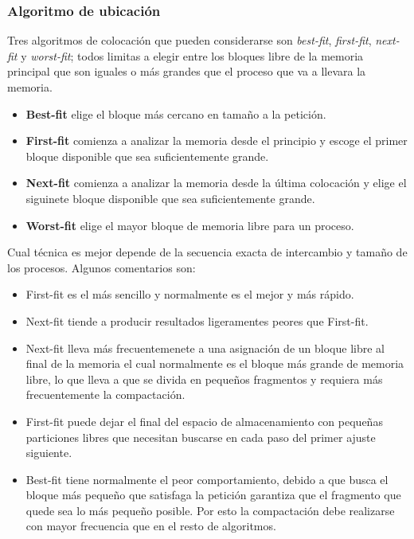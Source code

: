 \documentclass[12pt, a4paper]{article}
\begin{document}
\subsubsection{Algoritmo de ubicación}
Tres algoritmos de colocación que pueden considerarse son \textit{best-fit}, \textit{first-fit}, \textit{next-fit} y \textit{worst-fit}; todos limitas a elegir entre los bloques libre de la memoria principal que son iguales o más grandes que el proceso que va a llevara  la memoria. 
\begin{itemize}
    \item \textbf{Best-fit} elige el bloque más cercano en tamaño a la petición.
    \item \textbf{First-fit} comienza a analizar la memoria desde el principio y escoge el primer bloque disponible que sea suficientemente grande.
    \item \textbf{Next-fit} comienza a analizar la memoria desde la última colocación y elige el siguinete bloque disponible que sea suficientemente grande.
    \item \textbf{Worst-fit} elige el mayor bloque de memoria libre para un proceso.
\end{itemize}
\begin{tcolorbox}[colback=cyan!10, colframe=blue!70, title=Nota]
    Cual técnica es mejor depende de la secuencia exacta de intercambio y tamaño de los procesos. Algunos comentarios son:
    \begin{itemize}
        \item First-fit es el más sencillo y normalmente es el mejor y más rápido.
        \item Next-fit tiende a producir resultados ligeramentes peores que First-fit.
        \item Next-fit lleva más frecuentemenete a una asignación de un bloque libre al final de la memoria el cual normalmente es el bloque más grande de memoria libre, lo que lleva a que se divida en pequeños fragmentos y requiera más frecuentemente la compactación.
        \item First-fit puede dejar el final del espacio de almacenamiento con pequeñas particiones libres que necesitan buscarse en cada paso del primer ajuste siguiente.
        \item Best-fit tiene normalmente el peor comportamiento, debido a que busca el bloque más pequeño que satisfaga la petición garantiza que el fragmento que quede sea lo más pequeño posible. Por esto la compactación debe realizarse con mayor frecuencia que en el resto de algoritmos.
    \end{itemize}
\end{tcolorbox}
\end{document}
